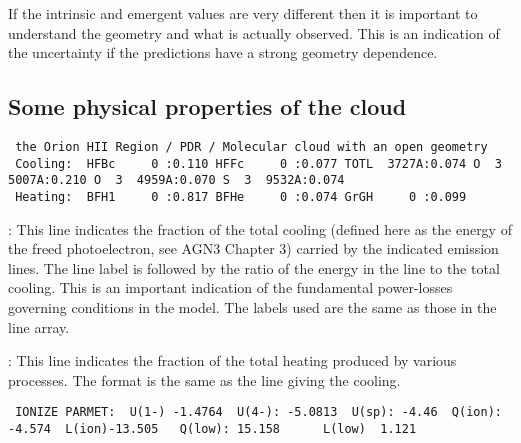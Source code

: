 If the intrinsic and emergent values are very different then it is
important to understand the geometry and what is actually observed.
This
is an indication of the uncertainty if the predictions have a strong
geometry dependence.

\subsection{Some physical properties of the cloud}

{\setverbatimfontsize{\tiny}
\begin{verbatim}
 the Orion HII Region / PDR / Molecular cloud with an open geometry
 Cooling:  HFBc     0 :0.110 HFFc     0 :0.077 TOTL  3727A:0.074 O  3  5007A:0.210 O  3  4959A:0.070 S  3  9532A:0.074
 Heating:  BFH1     0 :0.817 BFHe     0 :0.074 GrGH     0 :0.099
\end{verbatim}
}

:  This line indicates the fraction of the total cooling (defined
here as the energy of the freed photoelectron, see AGN3 Chapter 3) carried
by the indicated emission lines.
The line label is followed by the ratio
of the energy in the line to the total cooling.
This is an important
indication of the fundamental power-losses governing conditions in the model.
The labels used are the same as those in the line array.

:  This line indicates the fraction of the total heating produced
by various processes.  The format is the same as the line giving the cooling.
{\setverbatimfontsize{\tiny}
\begin{verbatim}
 IONIZE PARMET:  U(1-) -1.4764  U(4-): -5.0813  U(sp): -4.46  Q(ion):   -4.574  L(ion)-13.505   Q(low): 15.158      L(low)  1.121
\end{verbatim}
}

